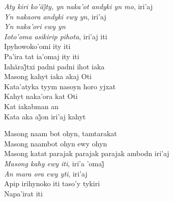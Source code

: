 \begin{linenumbers}
\noindent \textit{Aty kiri ko’ãj̃ty, yn naka’ot andyki yn mo}, iri’aj\\
\textit{Yn nakaora andyki ewy yn}, iri'aj\\
\textit{Yn naka'ori ewy yn}\\
\textit{Ioto'oma asikirip pihota}, iri'aj iti\\
Ipyhowoko'omi ity iti\\
Pa'ira tat ia'omaj ity iti\\
Iahãraj̃txi padni padni ihot iaka\\
Masong kahyt iaka akaj Oti\\
Kata'atyka tyym nasoyn horo yjxat\\
Kahyt naka'ora kat Oti\\
Kat iakabman an\\
Kata aka aj̃on iri’aj kahyt

\end{linenumbers}

\bigskip

\begin{linenumbers}
\noindent Masong naam bot ohyn, tamtarakat\\
Masong naambot ohyn ewy ohyn\\
Masong katat parajak parajak parajak ambodn iri'aj\\
\textit{Masong kahy ewy iti}, iri’a ’omaj̃\\
\textit{An mara ora ewy yti}, iri'aj\\
Apip irihynoko iti taso'y tykiri\\
Napa'irat iti

\end{linenumbers}

